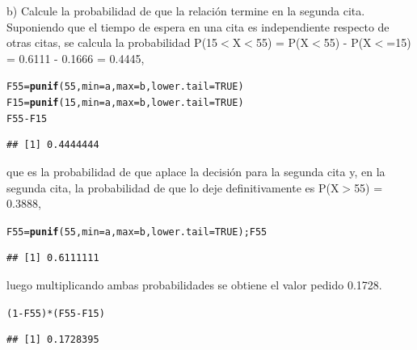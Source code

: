 \documentclass[12pt,letterpaper]{article}\usepackage[]{graphicx}\usepackage[]{color}
\makeatletter
\newcommand{\hlnum}[1]{\textcolor[rgb]{0.686,0.059,0.569}{#1}}%
\newcommand{\hlopt}[1]{\textcolor[rgb]{0,0,0}{#1}}%
\newcommand{\hlstd}[1]{\textcolor[rgb]{0.345,0.345,0.345}{#1}}%
\newcommand{\hlkwb}[1]{\textcolor[rgb]{0.69,0.353,0.396}{#1}}%
\newcommand{\hlkwc}[1]{\textcolor[rgb]{0.333,0.667,0.333}{#1}}%
\newcommand{\hlkwd}[1]{\textcolor[rgb]{0.737,0.353,0.396}{\textbf{#1}}}%
\newenvironment{kframe}{%
 \def\at@end@of@kframe{}%
 \ifinner\ifhmode%
  \def\at@end@of@kframe{\end{minipage}}%
  \begin{minipage}{\columnwidth}%
 \fi\fi%
 \def\FrameCommand##1{\hskip\@totalleftmargin \hskip-\fboxsep
 \colorbox{shadecolor}{##1}\hskip-\fboxsep
     \hskip-\linewidth \hskip-\@totalleftmargin \hskip\columnwidth}%
 \MakeFramed {\advance\hsize-\width
   \@totalleftmargin\z@ \linewidth\hsize
   \@setminipage}}%
 {\par\unskip\endMakeFramed%
 \at@end@of@kframe}
\newenvironment{knitrout}{}{} %
\makeatother
\begin{document}
\begin{description}
  \item b) Calcule la probabilidad de que la relaci\'on termine en la segunda cita.\\
  
Suponiendo que el tiempo de espera en una cita es independiente respecto de otras citas, se calcula la probabilidad P(15$<$X$<$55) = P(X$<$55) - P(X$<$=15) = 0.6111 - 0.1666 = 0.4445,
\begin{knitrout}
\color{fgcolor}\begin{kframe}
\begin{alltt}
\hlstd{F55}\hlkwb{=}\hlkwd{punif}\hlstd{(}\hlnum{55}\hlstd{,} \hlkwc{min}\hlstd{=a,} \hlkwc{max}\hlstd{=b,} \hlkwc{lower.tail}\hlstd{=}\hlnum{TRUE}\hlstd{)}
\hlstd{F15}\hlkwb{=}\hlkwd{punif}\hlstd{(}\hlnum{15}\hlstd{,} \hlkwc{min}\hlstd{=a,} \hlkwc{max}\hlstd{=b,} \hlkwc{lower.tail}\hlstd{=}\hlnum{TRUE}\hlstd{)}
\hlstd{F55}\hlopt{-}\hlstd{F15}
\end{alltt}
\begin{verbatim}
## [1] 0.4444444
\end{verbatim}
\end{kframe}
\end{knitrout}
\end{description}
que es la probabilidad de que aplace la decisi\'on para la segunda cita y, en la segunda cita, la probabilidad de que lo deje definitivamente es P(X$>$55) = 0.3888,
\begin{knitrout}
\color{fgcolor}\begin{kframe}
\begin{alltt}
\hlstd{F55}\hlkwb{=}\hlkwd{punif}\hlstd{(}\hlnum{55}\hlstd{,} \hlkwc{min}\hlstd{=a,} \hlkwc{max}\hlstd{=b,} \hlkwc{lower.tail}\hlstd{=}\hlnum{TRUE}\hlstd{);F55}
\end{alltt}
\begin{verbatim}
## [1] 0.6111111
\end{verbatim}
\end{kframe}
\end{knitrout}
luego multiplicando ambas probabilidades se obtiene el valor pedido 0.1728.
\begin{knitrout}
\color{fgcolor}\begin{kframe}
\begin{alltt}
\hlstd{(}\hlnum{1}\hlopt{-}\hlstd{F55)}\hlopt{*}\hlstd{( F55}\hlopt{-}\hlstd{F15)}
\end{alltt}
\begin{verbatim}
## [1] 0.1728395
\end{verbatim}
\end{kframe}
\end{knitrout}
\end{document}

